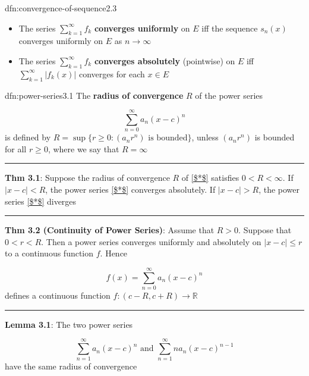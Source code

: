 \documentclass[landscape, 8pt]{extarticle}
\begin{document}
\begin{multicols}{3}
\begin{dfn}{dfn:convergence-of-sequence}{2.3}
\begin{itemize}
		\item The series $\sum_{k=1}^{\infty} f_{k}$ \textbf{converges uniformly} on $E$ iff the sequence $s_{n}(x)$ converges uniformly on $E$ as $n\to\infty$

		\item The series $\sum_{k=1}^{\infty} f_{k}$ \textbf{converges absolutely} (pointwise) on $E$ iff $\sum_{k=1}^{\infty} \lvert f_{k}(x) \rvert$ converges for each $x\in E$

	\end{itemize}
\end{dfn}

\newpage
\begin{dfn}{dfn:power-series}{3.1}
	\vspace{-5pt}
	The \textbf{radius of convergence} $R$ of the power series

	\vspace{-8pt}
	\begin{equation}
		\sum_{n=0}^{\infty} a_{n}(x-c)^{n}\tag{$*$}\label{$*$}
	\end{equation}
	is defined by $R=\sup\{r\ge 0:(a_{n}r^n) \text{ is bounded}\}$, unless $(a_{n}r^{n})$ is bounded for all $r\ge 0$, where we say that $R=\infty$

	\noindent\rule{\textwidth}{0.2pt}

	\textbf{Thm 3.1}: Suppose the radius of convergence $R$ of \ref{$*$} satisfies $0<R<\infty$. If $\lvert x-c \rvert<R$, the power series \ref{$*$} converges absolutely. If $\lvert x-c \rvert>R$, the power series \ref{$*$} diverges

	\vspace{-5pt}
	\noindent\rule{\textwidth}{0.2pt}

	\textbf{Thm 3.2 (Continuity of Power Series)}: Assume that $R>0$. Suppose that $0<r<R$. Then a power series converges uniformly and absolutely on $\lvert x-c \rvert\le r$ to a continuous function $f$. Hence

	\vspace{-8pt}
	\[f(x)=\sum_{n=0}^{\infty} a_{n}(x-c)^{n}\]
	defines a continuous function $f:(c-R,c+R)\to \mathbb{R}$

	\vspace{-5pt}
	\noindent\rule{\textwidth}{0.2pt}
	\textbf{Lemma 3.1}: The two power series

	\vspace{-8pt}
	\[\sum_{n=1}^{\infty} a_{n}(x-c)^{n}\text{ and } \sum_{n=1}^{\infty} na_{n}(x-c)^{n-1}\]
	have the same radius of convergence


\end{dfn}
\end{multicols}
\end{document}

